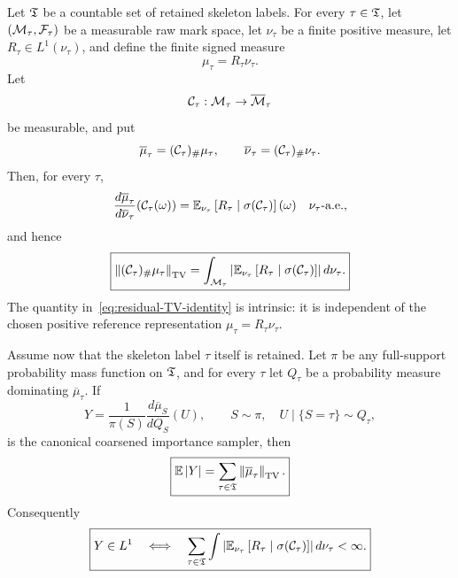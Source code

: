 \begin{theorem}
\label{thm:residual-characterization}
Let $\mathfrak T$ be a countable set of retained skeleton labels. For every $\tau\in\mathfrak T$, let $(\mathcal M_\tau,\mathcal F_\tau)$ be a measurable raw mark space, let $\nu_\tau$ be a finite positive measure, let $R_\tau\in L^1(\nu_\tau)$, and define the finite signed measure
\begin{equation*}
  \mu_\tau=R_\tau\nu_\tau.
\end{equation*}
Let
\begin{equation*}
  \mathcal C_\tau:\mathcal M_\tau\to\overline{\mathcal M}_\tau
\end{equation*}
be measurable, and put
\begin{equation*}
  \overline\mu_\tau
  =
  (\mathcal C_\tau)_\#\mu_\tau,
  \qquad
  \overline\nu_\tau
  =
  (\mathcal C_\tau)_\#\nu_\tau.
\end{equation*}
Then, for every $\tau$,
\begin{equation}
  \frac{d\overline\mu_\tau}{d\overline\nu_\tau}
  (\mathcal C_\tau(\omega))
  =
  \mathbb E_{\nu_\tau}
  \left[
    R_\tau
    \mid
    \sigma(\mathcal C_\tau)
  \right](\omega)
  \quad
  \nu_\tau\text{-a.e.},
  \label{eq:conditional-pushforward-density}
\end{equation}
and hence
\begin{equation}
  \boxed{
  \left\lVert(\mathcal C_\tau)_\#\mu_\tau\right\rVert_{\mathrm{TV}}
  =
  \int_{\mathcal M_\tau}
  \left|
    \mathbb E_{\nu_\tau}
    \left[R_\tau\mid\sigma(\mathcal C_\tau)\right]
  \right|
  d\nu_\tau.
  }
  \label{eq:residual-TV-identity}
\end{equation}
The quantity in~\eqref{eq:residual-TV-identity} is intrinsic: it is independent of the chosen positive reference representation $\mu_\tau=R_\tau\nu_\tau$.

Assume now that the skeleton label $\tau$ itself is retained. Let $\pi$ be any full-support probability mass function on $\mathfrak T$, and for every $\tau$ let $Q_\tau$ be a probability measure dominating $\overline\mu_\tau$. If
\begin{equation}
  Y
  =
  \frac1{\pi(S)}
  \frac{d\overline\mu_S}{dQ_S}(U),
  \qquad
  S\sim\pi,
  \quad
  U\mid\{S=\tau\}\sim Q_\tau,
  \label{eq:canonical-coarsened-weight}
\end{equation}
is the canonical coarsened importance sampler, then
\begin{equation}
  \boxed{
  \mathbb E\left|Y\right|
  =
  \sum_{\tau\in\mathfrak T}
  \left\lVert\overline\mu_\tau\right\rVert_{\mathrm{TV}}.
  }
  \label{eq:coarsened-L1-sum}
\end{equation}
Consequently
\begin{equation}
  \boxed{
  Y\in L^1
  \quad\Longleftrightarrow\quad
  \sum_{\tau\in\mathfrak T}
  \int
  \left|
    \mathbb E_{\nu_\tau}
    \left[R_\tau\mid\sigma(\mathcal C_\tau)\right]
  \right|
  d\nu_\tau
  <\infty.
  }
  \label{eq:exact-L1-characterization}
\end{equation}


\end{theorem}
